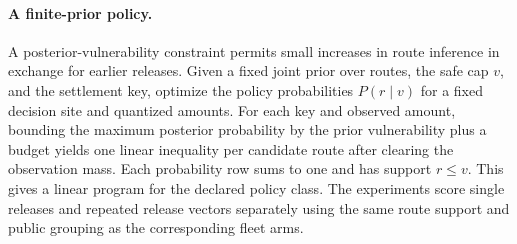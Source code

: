 \paragraph{A finite-prior policy.}
A posterior-vulnerability constraint permits small increases in route inference in exchange for earlier releases. Given a fixed joint prior over routes, the safe cap $v$, and the settlement key, optimize the policy probabilities $P(r\mid v)$ for a fixed decision site and quantized amounts. For each key and observed amount, bounding the maximum posterior probability by the prior vulnerability plus a budget yields one linear inequality per candidate route after clearing the observation mass. Each probability row sums to one and has support $r\le v$. This gives a linear program for the declared policy class. The experiments score single releases and repeated release vectors separately using the same route support and public grouping as the corresponding fleet arms.
